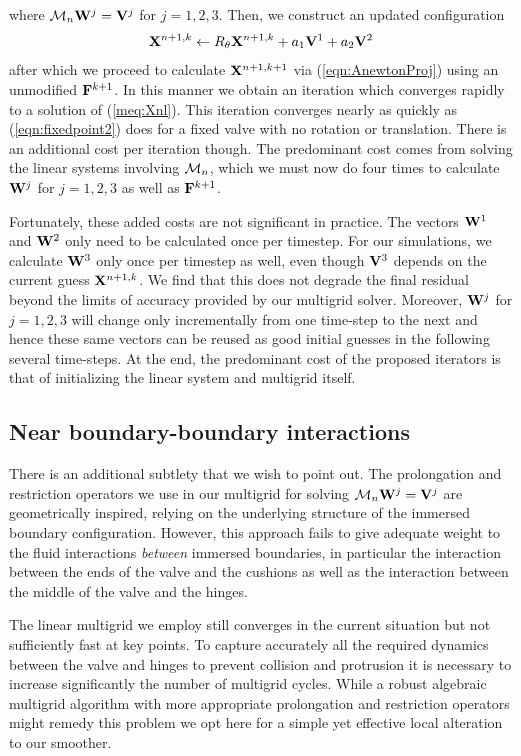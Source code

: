 where $\mathcal{M}_n\mathbf{W}^j = \mathbf{V}^j$ for $j=1,2,3$.
Then, we construct an updated configuration 
\begin{equation}
\mathbf{X}^{n+1,k} \leftarrow R_{\theta}\mathbf{X}^{n+1,k}+a_1\mathbf{V}^1+a_2\mathbf{V}^2
\label{eqn:Rotate}
\end{equation}
after which we proceed to calculate $\mathbf{X}^{n+1,k+1}$ via (\ref{eqn:AnewtonProj}) using an unmodified $\mathbf{F}^{k+1}$.
In this manner we obtain an iteration which converges rapidly to a solution of (\ref{meq:Xnl}).
This iteration converges nearly as quickly as (\ref{eqn:fixedpoint2}) does for a fixed valve with no rotation or translation. There is an additional cost per iteration though. The predominant cost comes from solving the linear systems involving $\mathcal{M}_n$, which we must now do four times to calculate $\mathbf{W}^j$ for $j=1,2,3$ as well as $\mathbf{F}^{k+1}$.

Fortunately, these added costs are not significant in practice. The vectors $\mathbf{W}^1$ and $\mathbf{W}^2$ only need to be calculated once per timestep. For our simulations, we calculate $\mathbf{W}^3$ only once per timestep as well, even though $\mathbf{V}^3$ depends on the current guess $\mathbf{X}^{n+1,k}$. We find that this does not degrade the final residual beyond the limits of accuracy provided by our multigrid solver. Moreover,  $\mathbf{W}^j$ for $j=1,2,3$ will change only incrementally from one time-step to the next and hence these same vectors can be reused  as good initial guesses in the following several time-steps. 
At the end, the predominant cost of  the proposed iterators is that of initializing the linear system and multigrid itself.

\subsection{Near boundary-boundary interactions}
There is an additional subtlety that we wish to point out. The prolongation and restriction operators we use in our multigrid for solving 
$\mathcal{M}_n\mathbf{W}^j = \mathbf{V}^j$  are geometrically inspired, relying on the underlying structure of the immersed boundary configuration. However, this approach fails to give adequate weight to the fluid interactions \textit{between} immersed boundaries, in particular the interaction between the ends of the valve and the cushions as well as the interaction between the middle of the valve and the hinges.

The linear multigrid we employ still converges in the current situation but not sufficiently fast at key points.  
To capture accurately all the required dynamics between the valve and hinges to prevent collision and protrusion
it is necessary to increase significantly the number of multigrid cycles. While a robust algebraic multigrid algorithm with more
appropriate  prolongation and restriction operators might remedy this problem we opt here for a simple yet effective local alteration to our smoother.

